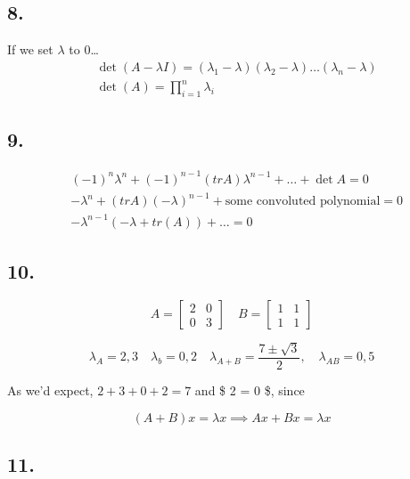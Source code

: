 \documentclass[
]{article}
\begin{document}
\hypertarget{section-5}{%
\subsection{8.}\label{section-5}}

If we set \(\lambda\) to 0\ldots{} \[
  \begin{aligned}
    & \det(A - \lambda I) = (\lambda_1 - \lambda)(\lambda_2 - \lambda) \dots (\lambda_n - \lambda)\\
    & \det(A) = \prod_{i=1}^n\lambda_i
  \end{aligned}
\]

\hypertarget{section-6}{%
\subsection{9.}\label{section-6}}

\[
  \begin{aligned}
    & (-1)^n\lambda^n +(-1)^{n-1}(trA)\lambda^{n-1}+\dots + \det A=0\\
    &-\lambda^n +(trA)(-\lambda)^{n-1} + \text{some convoluted polynomial} = 0\\
    & -\lambda^{n-1}(-\lambda + tr(A)) + \dots =0
  \end{aligned}
\]

\hypertarget{section-7}{%
\subsection{10.}\label{section-7}}

\[A=  \begin{bmatrix}
  2 & 0\\
  0 & 3
\end{bmatrix} \quad B = \begin{bmatrix}
  1 & 1\\
  1 & 1
\end{bmatrix}\]

\[\lambda_A = 2,3 \quad \lambda_b = 0, 2 \quad \lambda_{A+B} = \frac{7 \pm \sqrt{3}}{2}, \quad \lambda_{AB} = 0, 5\]

As we'd expect, \(2 + 3 + 0 + 2=7\) and \$ 2    = 0
\$, since

\[(A + B)x = \lambda x \implies Ax + Bx = \lambda x\]

\hypertarget{section-8}{%
\subsection{11.}\label{section-8}}
\end{document}
